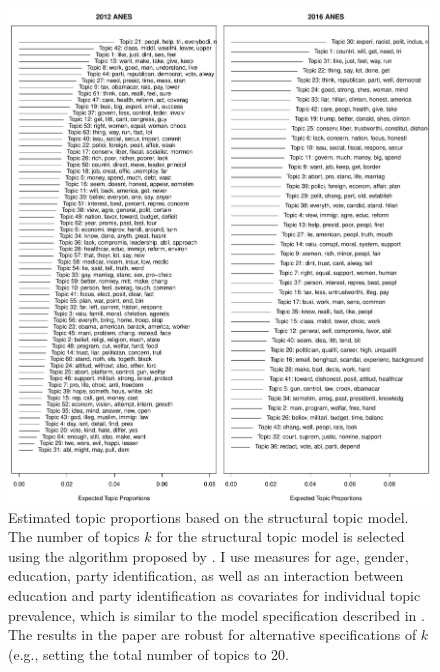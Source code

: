 \documentclass[12pt]{article}
\begin{document}
\begin{figure}[h]\centering
\includegraphics[width=\textwidth]{../fig/stm_prop.pdf}
\caption{Estimated topic proportions based on the structural topic model. The number of topics $k$ for the structural topic model is selected using the algorithm proposed by \citet{lee2014low}. I use measures for age, gender, education, party identification, as well as an interaction between education and party identification as covariates for individual topic prevalence, which is similar to the model specification described in \citet{roberts2014structural}. The results in the paper are robust for alternative specifications of $k$ (e.g., setting the total number of topics to 20.}\label{fig:stm_prop}
\end{figure}
\end{document}
